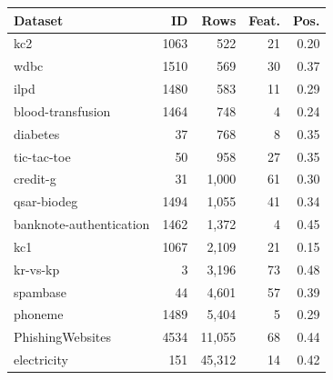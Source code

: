 \begin{tabular}{@{}lrrrr@{}}
\toprule
Dataset & ID & Rows & Feat. & Pos. \\
\midrule
kc2 & 1063 & 522 & 21 & 0.20 \\
wdbc & 1510 & 569 & 30 & 0.37 \\
ilpd & 1480 & 583 & 11 & 0.29 \\
blood-transfusion & 1464 & 748 & 4 & 0.24 \\
diabetes & 37 & 768 & 8 & 0.35 \\
tic-tac-toe & 50 & 958 & 27 & 0.35 \\
credit-g & 31 & 1,000 & 61 & 0.30 \\
qsar-biodeg & 1494 & 1,055 & 41 & 0.34 \\
banknote-authentication & 1462 & 1,372 & 4 & 0.45 \\
kc1 & 1067 & 2,109 & 21 & 0.15 \\
kr-vs-kp & 3 & 3,196 & 73 & 0.48 \\
spambase & 44 & 4,601 & 57 & 0.39 \\
phoneme & 1489 & 5,404 & 5 & 0.29 \\
PhishingWebsites & 4534 & 11,055 & 68 & 0.44 \\
electricity & 151 & 45,312 & 14 & 0.42 \\
\bottomrule
\end{tabular}